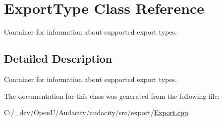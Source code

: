 \hypertarget{class_export_type}{}\section{Export\+Type Class Reference}
\label{class_export_type}


Container for information about supported export types.  




\subsection{Detailed Description}
Container for information about supported export types. 

The documentation for this class was generated from the following file\+:\begin{DoxyCompactItemize}
\item 
C\+:/\+\_\+dev/\+Open\+U/\+Audacity/audacity/src/export/\hyperlink{_export_8cpp}{Export.\+cpp}\end{DoxyCompactItemize}
